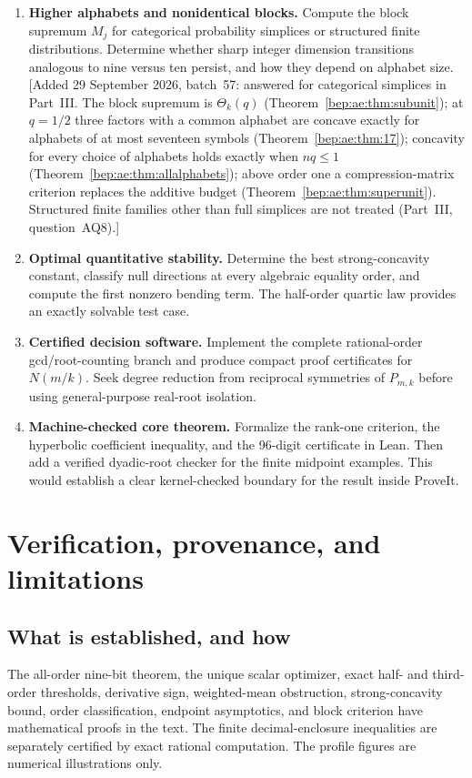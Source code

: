 \documentclass[11pt]{article}
\numberwithin{equation}{section}
\theoremstyle{definition}
\theoremstyle{remark}
\begin{document}
\begin{enumerate}[label=\textbf{Q\arabic*.},leftmargin=3.2em]
\item \textbf{Higher alphabets and nonidentical blocks.}
Compute the block supremum $M_j$ for categorical probability simplices
or structured finite distributions. Determine whether sharp integer
dimension transitions analogous to nine versus ten persist, and how
they depend on alphabet size.
[Added 29 September 2026, batch~57: answered for categorical simplices
in Part~III. The block supremum is $\Theta_k(q)$
(Theorem~\ref{bep:ae:thm:subunit}); at $q=1/2$ three factors with a
common alphabet are concave exactly for alphabets of at most seventeen
symbols (Theorem~\ref{bep:ae:thm:17}); concavity for every choice of
alphabets holds exactly when $nq\leq1$
(Theorem~\ref{bep:ae:thm:allalphabets}); above order one a
compression-matrix criterion replaces the additive budget
(Theorem~\ref{bep:ae:thm:superunit}). Structured finite families other
than full simplices are not treated (Part~III, question~AQ8).]

\item \textbf{Optimal quantitative stability.}
Determine the best strong-concavity constant, classify null directions
at every algebraic equality order, and compute the first nonzero
bending term. The half-order quartic law provides an exactly solvable
test case.

\item \textbf{Certified decision software.}
Implement the complete rational-order gcd/root-counting branch and
produce compact proof certificates for $N(m/k)$. Seek degree reduction
from reciprocal symmetries of $P_{m,k}$ before using general-purpose
real-root isolation.

\item \textbf{Machine-checked core theorem.}
Formalize the rank-one criterion, the hyperbolic coefficient inequality,
and the 96-digit certificate in Lean. Then add a verified dyadic-root
checker for the finite midpoint examples. This would establish a clear
kernel-checked boundary for the result inside ProveIt.
\end{enumerate}

\section{Verification, provenance, and limitations}\label{bep:pe:sec:verification}
\subsection{What is established, and how}
The all-order nine-bit theorem, the unique scalar optimizer, exact
half- and third-order thresholds, derivative sign, weighted-mean
obstruction, strong-concavity bound, order classification, endpoint
asymptotics, and block criterion have mathematical proofs in the text.
The finite decimal-enclosure inequalities are separately certified by
exact rational computation. The profile figures are numerical
illustrations only.
\end{document}
